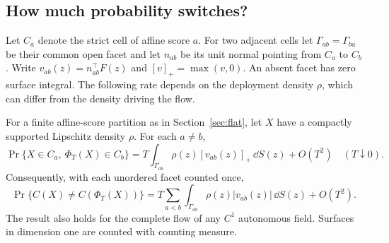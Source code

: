 \subsection{How much probability switches?}
\label{sec:switching-mass}

Let $C_a$ denote the strict cell of affine score $a$. For two adjacent
cells let $\Gamma_{ab}=\Gamma_{ba}$ be their common open facet and let
$n_{ab}$ be its unit normal pointing from $C_a$ to $C_b$. Write
$v_{ab}(z)=n_{ab}^{\top}F(z)$ and $[v]_+=\max(v,0)$. An absent facet
has zero surface integral. The following rate depends on the deployment
density $\rho$, which can differ from the density driving the flow.

\begin{theorem}
\label{thm:switch-mass}
For a finite affine-score partition as in Section~\ref{sec:flat}, let
$X$ have a compactly supported Lipschitz density $\rho$. For each $a\ne b$,
\begin{equation}
 \Pr\{X\in C_a,\ \Phi_T(X)\in C_b\}
 =T\int_{\Gamma_{ab}}\rho(z)[v_{ab}(z)]_+\,\dd S(z)+O(T^2)
 \quad(T\downarrow0).
 \label{eq:directed-switch-mass}
\end{equation}
Consequently, with each unordered facet counted once,
\begin{equation}
 \Pr\{C(X)\ne C(\Phi_T(X))\}
 =T\sum_{a<b}\int_{\Gamma_{ab}}\rho(z)|v_{ab}(z)|\,\dd S(z)+O(T^2).
 \label{eq:total-switch-mass}
\end{equation}
The result also holds for the complete flow of any $C^1$ autonomous
field. Surfaces in dimension one are counted with counting measure.
\end{theorem}

